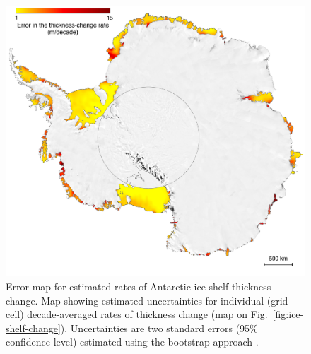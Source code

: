 \begin{figure}[!h]
  \centering
  \includegraphics[width=\textwidth]{img/Sup4_error_review_v6.png}
  \caption[Error map for estimated rates of Antarctic ice-shelf]{
  \ssp \footnotesize
Error map for estimated rates of Antarctic ice-shelf thickness change. Map showing estimated uncertainties for individual (grid cell) decade-averaged rates of thickness change (map on Fig.~\ref{fig:ice-shelf-change}). Uncertainties are two standard errors (95\% confidence level) estimated using the bootstrap approach \parencite[see text;][]{Efron1993}.
  }
  \label{c3f8}
\end{figure}



